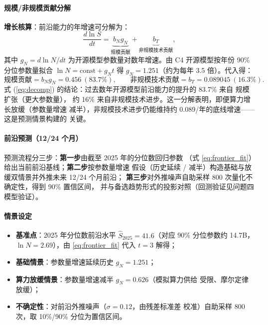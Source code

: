 \paragraph{规模/非规模贡献分解}

\textbf{增长核算}：前沿能力的年增速可分解为：
\begin{equation}
\frac{d\ln S}{dt}=\underbrace{b_N g_N}_{\text{规模贡献}}
+\underbrace{b_T}_{\text{非规模技术贡献}},
\label{eq:growthacc}
\end{equation}
其中 $g_N=d\ln N/dt$ 为开源模型参数量对数年增速。由 C4 开源模型按年份
90\% 分位参数量拟合 $\ln N=\text{const}+g_N t$ 得 $g_N=1.251$（约为每年
3.5 倍）。代入得：
\begin{equation}
\text{规模贡献}=b_N g_N=0.456\ (83.7\%),\qquad
\text{非规模技术贡献}=b_T=0.089045\ (16.3\%).
\label{eq:decomp}
\end{equation}
式 (\ref{eq:decomp}) 的结论：过去数年开源模型前沿能力的提升的 83.7\% 来自
规模扩张（更大参数量），
约 16\% 来自非规模技术进步。这一分解表明，即便算力增长放缓（参数量增速
减半），非规模技术进步仍能维持约 0.089/年的底线增速——这是预测情景构建的
关键。

\paragraph{前沿预测（12/24 个月）}

预测流程分三步：\textbf{第一步}由截至 2025 年的分位数回归参数
（式 \ref{eq:frontier_fit}）给出当前前沿基线；\textbf{第二步}按参数量增速
假设（历史延续 / 减半）构造基础与放缓双情景并外推未来 12/24 个月前沿；
\textbf{第三步}对外推噪声自助采样 800 次量化不确定性，得到 90\% 置信区间，
并与备选趋势形式的投影对照（回测验证见问题四模型验证）。

\paragraph{情景设定}

\begin{itemize}
\item \textbf{基准点}：2025 年分位数前沿水平 $\hat S_{2025}=41.6$（对应
90\% 分位参数约 14.7B，$\ln N=2.69$），由 \eqref{eq:frontier_fit} 代入
$t=3$ 解得；
\item \textbf{基础情景}：参数量增速延续历史 $g_N=1.251$；
\item \textbf{算力放缓情景}：参数量增速减半 $g_N=0.626$（模拟算力供给
受限、摩尔定律放缓\cite{refKoomey}）；
\item \textbf{不确定性}：对前沿外推噪声（$\sigma=0.12$，由残差标准差
校准）自助采样 800 次，取 10\%/90\% 分位为置信区间。
\end{itemize}

